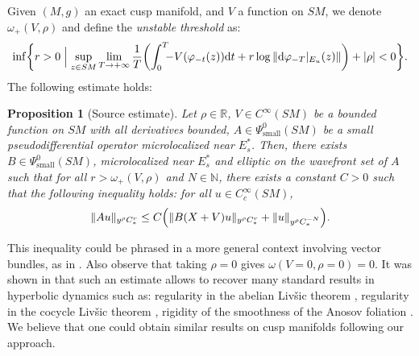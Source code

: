 \documentclass[10pt]{amsart}
\newcommand{\R}{\mathbb{R}}
\newcommand{\N}{\mathbb{N}}
\newcommand{\dd}{\mathrm{d}}
\theoremstyle{plain}
\newtheorem{proposition}{Proposition}[section]
\theoremstyle{definition}
\begin{document}
Given $(M,g)$ an exact cusp manifold, and $V$ a function on $SM$, we denote $\omega_+(V,\rho)$ and define the \emph{unstable threshold} as:
\begin{equation}
\label{equation:threshold}
\inf\biggl\{r > 0\Bigm| \sup_{z \in SM} \lim_{T \to +\infty} \frac{1}{T} \biggl(\int_0^T\hspace{-5pt} -V(\varphi_{-t}(z)) \dd t + r \log \|\dd \varphi_{-T}|_{E_u}(z)\|\biggr) + |\rho| < 0 \biggr\}.
\end{equation}
The following estimate holds:
\begin{proposition}[Source estimate]
\label{proposition:radiale}
Let $\rho \in \R$, $V \in C^\infty(SM)$ be a bounded function on $SM$ with all derivatives bounded, $A \in \Psi^0_{\mathrm{small}}(SM)$ be a small pseudodifferential operator microlocalized near $E_s^*$. Then, there exists $B \in \Psi^0_{\mathrm{small}}(SM)$, microlocalized near $E_s^*$ and elliptic on the wavefront set of $A$ such that for all $r > \omega_+(V,\rho)$ and $N \in \N$, there exists a constant $C > 0$ such that the following inequality holds: for all $u \in C^\infty_c(SM)$,
\begin{equation}
\label{equation:radiale}
\|Au \|_{y^\rho C^r_*} \leq C \Bigl(\|B(X+V)u\|_{y^\rho C^r_*} + \|u\|_{y^\rho C^{-N}_*} \Bigr).
\end{equation}
\end{proposition}

This inequality could be phrased in a more general context involving vector bundles, as in \cite{Bonthonneau-Lefeuvre-21}. Also observe that taking $\rho = 0$ gives $\omega(V=0,\rho=0) = 0$. It was shown in \cite{Bonthonneau-Lefeuvre-21} that such an estimate allows to recover many standard results in hyperbolic dynamics such as: regularity in the abelian Liv\v{s}ic theorem \cite{Livsic-72,DeLaLlave-Marco-Moryon-86}, regularity in the cocycle Liv\v{s}ic theorem \cite{Nitica-Torok-98}, rigidity of the smoothness of the Anosov foliation \cite{Hasselblatt-92}. We believe that one could obtain similar results on cusp manifolds following our approach.
\end{document}
